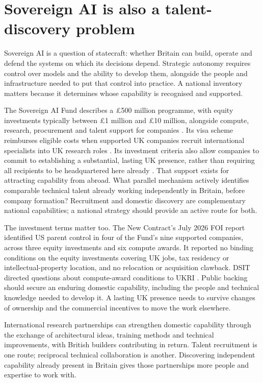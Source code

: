 \section{Sovereign AI is also a talent-discovery problem}
Sovereign AI is a question of statecraft: whether Britain can build,
operate and defend the systems on which its decisions depend. Strategic
autonomy requires control over models and the ability to develop them,
alongside the people and infrastructure needed to put that control into
practice. A national inventory matters because it determines whose
capability is recognised and supported.

The Sovereign AI Fund describes a \pounds500 million programme, with equity
investments typically between \pounds1 million and \pounds10 million, alongside
compute, research, procurement and talent support for companies
\cite{sovereignfaq}. Its visa scheme reimburses eligible costs when supported
UK companies recruit international specialists into UK research roles
\cite{sovereignoffer}. Its investment criteria also allow companies to
commit to establishing a substantial, lasting UK presence, rather than
requiring all recipients to be headquartered here already
\cite{sovereignfaq}. That support exists for attracting capability from abroad.
What parallel mechanism actively identifies comparable
technical talent already working independently in Britain, before company
formation? Recruitment and domestic discovery are complementary national
capabilities; a national strategy should provide an active route for both.

The investment terms matter too. The New Contract's July 2026 FOI report
identified US parent control in four of the Fund's nine supported companies,
across three equity investments and six compute awards. It reported no
binding conditions on the equity investments covering UK jobs, tax residency
or intellectual-property location, and no relocation or acquisition
clawback. DSIT directed questions about compute-award conditions to UKRI
\cite{sovereignfoi2026}. Public backing should secure an enduring domestic
capability, including the people and technical knowledge needed to develop
it. A lasting UK presence needs to survive changes of ownership and the
commercial incentives to move the work elsewhere.

International research partnerships can strengthen domestic capability
through the exchange of architectural
ideas, training methods and technical improvements, with British builders
contributing in return. Talent recruitment is one route; reciprocal
technical collaboration is another. Discovering independent capability
already present in Britain gives those partnerships more people and
expertise to work with.

